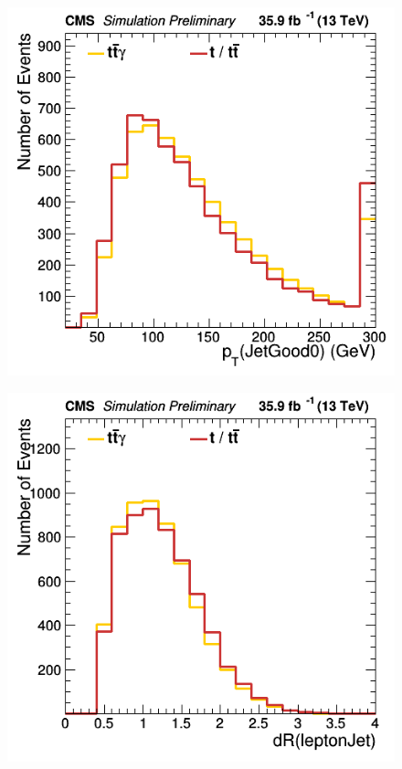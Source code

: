 \documentclass[11pt]{scrartcl}
\begin{document}
	\begin{figure}[H]
	\centering
	\begin{minipage}{.5\textwidth}
	  \centering
	  \includegraphics[width=0.75\linewidth]{figures/Select1/JetGood0_pt.png}
	  \label{fig:JetGood0pt}
	\end{minipage}%
	\begin{minipage}{.5\textwidth}
	  \centering
	  \includegraphics[width=0.75\linewidth]{figures/Select1/leptonJetdR.png}
	  \label{fig:leptonJetdR}
	\end{minipage}
	\end{figure}
	
\end{document}
